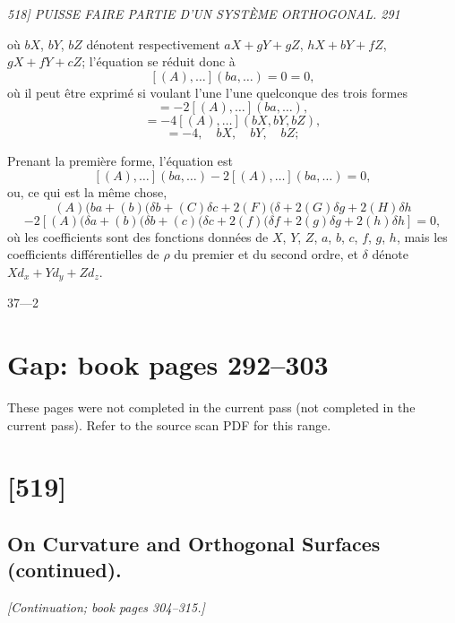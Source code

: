 \documentclass[11pt,a4paper]{book}
\begin{document}
\clearpage

\noindent\textit{518] \hfill PUISSE FAIRE PARTIE D'UN SYST\`EME ORTHOGONAL. \hfill 291}

\medskip

o\`u $bX$, $bY$, $bZ$ d\'enotent respectivement $aX + g Y + g Z$, $h X + b Y + f Z$, $g X + f Y + c Z$;
l'\'equation se r\'eduit donc \`a
\[
[(A), \ldots](b a, \ldots) = 0 = 0,
\]
o\`u il peut \^etre exprim\'e si voulant l'une l'une quelconque des trois formes
\[
= - 2 [(A), \ldots](b a, \ldots),
\]
\[
= - 4 [(A), \ldots](b X, b Y, b Z),
\]
\[
= - 4, \quad b X, \quad b Y, \quad b Z;
\]

Prenant la premi\`ere forme, l'\'equation est
\[
[(A), \ldots](b a, \ldots) - 2[(A), \ldots](b a, \ldots) = 0,
\]
ou, ce qui est la m\^eme chose,
\[
(A)(b a + (b)(\delta b + (C)\delta c + 2(F)(\delta + 2(G)\delta g + 2(H)\delta h
\]
\[
- 2[(A)(\delta a + (b)(\delta b + (c)(\delta c + 2(f)(\delta f + 2(g)\delta g + 2(h)\delta h] = 0,
\]
o\`u les coefficients sont des fonctions donn\'ees de $X$, $Y$, $Z$, $a$, $b$, $c$, $f$, $g$, $h$, mais les coefficients
diff\'erentielles de $\rho$ du premier et du second ordre, et $\delta$ d\'enote $X d_x + Y d_y + Z d_z$.

\medskip
\hfill 37---2
\clearpage


\clearpage
\section*{Gap: book pages 292--303}
\noindent These pages were not completed in the current pass (not completed in the current pass). Refer to the source scan PDF for this range.
\clearpage


\section{[519]}
\subsection{On Curvature and Orthogonal Surfaces (continued).}

\begin{center}
\textit{[Continuation; book pages 304--315.]}
\end{center}
\end{document}

